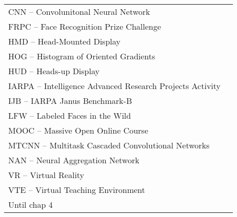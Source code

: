 
\begin{thenotations}
\renewcommand{\arraystretch}{1.5}
  \noindent
  \begin{tabular}{ll}

CNN -- Convolunitonal Neural Network\\
FRPC -- Face Recognition Prize Challenge\\
HMD -- Head-Mounted Display\\
HOG -- Histogram of Oriented Gradients\\
HUD -- Heads-up Display\\
IARPA -- Intelligence Advanced Research Projects Activity\\
IJB -- IARPA Janus Benchmark-B\\
LFW -- Labeled Faces in the Wild\\
MOOC -- Massive Open Online Course\\
MTCNN -- Multitask Cascaded Convolutional Networks\\
NAN -- Neural Aggregation Network\\
VR -- Virtual Reality\\
VTE -- Virtual Teaching Environment\\

Until chap 4

  \end{tabular}

\end{thenotations}